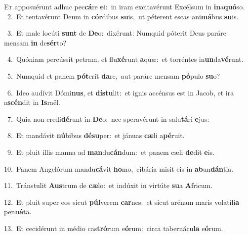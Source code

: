 \lettrine{\initial\textcolor{\initialcolor}{E}}{t} apposuérunt adhuc pec\-\textbf{cá}\-re \textbf{e}\-i:~\star in iram excitavérunt Excélsum in \textbf{in}\-a\-\textbf{quó}\-so.\\
{\numbfont\textcolor{\numbcolor}{~2.}}~Et tentavérunt Deum in \textbf{cór}\-dibus \textbf{su}\-is,~\star ut péterent escas ani\-\textbf{má}\-bus \textbf{su}\-is.\par
{\numbfont\textcolor{\numbcolor}{~3.}}~Et male locúti \textbf{sunt} de \textbf{De}\-o:~\star dixérunt: Numquid póterit Deus paráre mensam \textbf{in} de\-\textbf{sér}\-to?\par
{\numbfont\textcolor{\numbcolor}{~4.}}~Quóniam percússit petram, et flu\-\textbf{xé}\-runt \textbf{a}\-quæ:~\star et torréntes in\-\textbf{un}\-da\-\textbf{vé}\-runt.\par
{\numbfont\textcolor{\numbcolor}{~5.}}~Numquid et panem \textbf{pót}\-erit \textbf{da}\-re,~\star aut paráre mensam \textbf{pó}\-pulo \textbf{su}\-o?\par
{\numbfont\textcolor{\numbcolor}{~6.}}~Ideo audívit Dómi\-\textbf{nus}\-, et \textbf{dís}\-\textbf{tu}lit:~\star et ignis accénsus est in Jacob, et ira a\-\textbf{scén}\-dit in \textbf{Is}\-raël.\par
{\numbfont\textcolor{\numbcolor}{~7.}}~Quia non credi\-\textbf{dé}\-runt in \textbf{De}\-o:~\star nec speravérunt in salu\-\textbf{tá}\-ri \textbf{e}\-jus:\par
{\numbfont\textcolor{\numbcolor}{~8.}}~Et mandávit \textbf{nú}\-bibus \textbf{dé}\-\textbf{su}per:~\star et jánuas \textbf{cæ}\-li a\-\textbf{pé}\-ruit.\par
{\numbfont\textcolor{\numbcolor}{~9.}}~Et pluit illis manna ad \textbf{man}\-du\-\textbf{cán}\-dum:~\star et panem cæli \textbf{de}\-dit \textbf{e}\-is.\par
{\numbfont\textcolor{\numbcolor}{10.}}~Panem Angelórum mandu\-\textbf{cá}\-vit \textbf{ho}\-mo,~\star cibária misit eis in \textbf{ab}\-un\-\textbf{dán}\-tia.\par
{\numbfont\textcolor{\numbcolor}{11.}}~Tránstulit \textbf{Aus}\-trum de \textbf{cæ}\-lo:~\star et indúxit in virtúte \textbf{su}\-a \textbf{A}\-fricum.\par
{\numbfont\textcolor{\numbcolor}{12.}}~Et pluit super eos sicut \textbf{púl}\-verem \textbf{car}\-nes:~\star et sicut arénam maris volatíli\textbf{a} pen\-\textbf{ná}\-ta.\par
{\numbfont\textcolor{\numbcolor}{13.}}~Et cecidérunt in médio cas\-\textbf{tró}\-rum e\-\textbf{ó}\-rum:~\star circa tabernácu\textbf{la} e\-\textbf{ó}\-rum.\par
